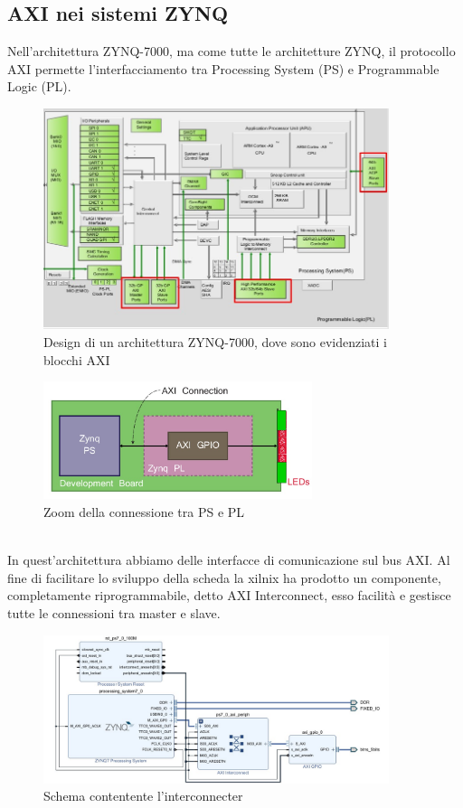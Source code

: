 \subsection{AXI nei sistemi ZYNQ}
Nell'architettura ZYNQ-7000, ma come tutte le architetture ZYNQ, il protocollo AXI permette l'interfacciamento tra Processing System (PS) e Programmable Logic (PL).
\begin{figure}
    \centering
    \includegraphics[width=0.9\textwidth]{images/AXI3.jpg}
    \caption{Design di un architettura ZYNQ-7000, dove sono evidenziati i blocchi AXI}
    \label{fig:my_label}
\end{figure}
\begin{figure}
    \centering
    \includegraphics[width=0.7\textwidth]{images/axi.jpg}
    \caption{Zoom della connessione tra PS e PL}
    \label{fig:my_label}
\end{figure}\\
In quest'architettura abbiamo delle interfacce di comunicazione sul bus AXI.
Al fine di facilitare lo sviluppo della scheda la xilnix ha prodotto un componente, completamente riprogrammabile, detto AXI Interconnect, esso facilità e gestisce tutte le connessioni tra master e slave.\clearpage
\begin{figure}
    \centering
    \includegraphics[width=0.9\textwidth]{images/AXI4.jpg}
    \caption{Schema contentente l'interconnecter}
    \label{fig:my_label}
\end{figure}
